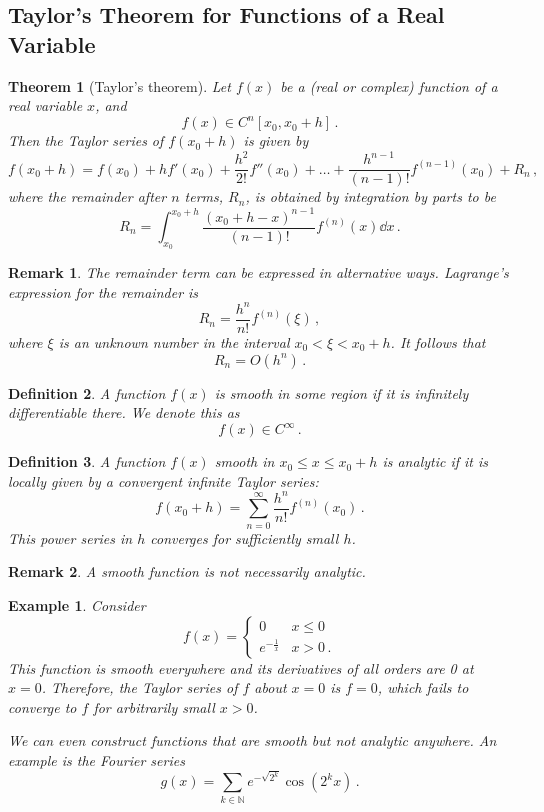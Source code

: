 \documentclass{article}
\theoremstyle{plain}\theoremheaderfont{\normalfont\itshape}\theorembodyfont{\rmfamily}\theoremseparator{.}\newtheorem*{rem}{Remark}\newtheorem*{ex}{Example}\newtheorem*{proof}{Proof}\newtheorem*{altp}{Alternative proof}
\theoremstyle{plain}\theoremheaderfont{\normalfont\bfseries}\theorembodyfont{\rmfamily}\theoremseparator{.}\newtheorem{thm}{Theorem}[section]\newtheorem{lem}[thm]{Lemma}\newtheorem{prop}[thm]{Proposition}\newtheorem*{cor}{Corollary}\newtheorem{defn}[thm]{Definition}\newtheorem{clm}[thm]{Claim}\newtheorem{clminproof}{Claim}
\theoremstyle{break}\theoremheaderfont{\normalfont\itshape}\theorembodyfont{\rmfamily}\theoremseparator{.\medskip}\newtheorem*{proofskip}{Proof}\newtheorem*{exs}{Examples}\newtheorem*{rems}{Remarks}
\theoremstyle{break}\theoremheaderfont{\normalfont\bfseries}\theorembodyfont{\rmfamily}\theoremseparator{.\medskip}\newtheorem{lemskip}[thm]{Lemma}\newtheorem{defnskip}[thm]{Definition}\newtheorem{propskip}[thm]{Proposition}\newtheorem{thmskip}[thm]{Theorem}
\numberwithin{equation}{section}
\begin{document}
	\subsection{Taylor's Theorem for Functions of a Real Variable}
	\begin{thm}[Taylor's theorem]		
		Let \(f(x)\) be a (real or complex) function of a real variable \(x\), and
		\[f(x)\in C^n [x_0,x_0+h]\,.\]
		Then the Taylor series of \(f(x_0+h)\) is given by
		\[f(x_0+h)=f(x_0)+hf'(x_0)+\frac{h^2}{2!}f''(x_0)+\dots+\frac{h^{n-1}}{(n-1)!}f^{(n-1)}(x_0)+R_n\,,\]
		where the remainder after \(n\) terms, \(R_n\), is obtained by integration by parts to be
		\[R_n=\int_{x_0}^{x_0+h}\frac{(x_0+h-x)^{n-1}}{(n-1)!}f^{(n)}(x)\dd{x}\,.\]
	\end{thm}
	
	\begin{rem}
		The remainder term can be expressed in alternative ways. Lagrange's expression for the remainder is
		\[R_n=\frac{h^n}{n!}f^{(n)}(\xi)\,,\]
		where \(\xi\) is an unknown number in the interval \(x_0<\xi<x_0+h\). It follows that
		\[R_n=O(h^n)\,.\]
	\end{rem}
	\begin{defn}
		A function \(f(x)\) is \textit{smooth} in some region if it is infinitely differentiable there. We denote this as
		\[f(x)\in C^\infty\,.\]
	\end{defn}
	\begin{defn}
		A function \(f(x)\) smooth in \(x_0\le x\le x_0+h\) is \textit{analytic} if it is locally given by a convergent infinite Taylor series:
		\[f(x_0+h)=\sum_{n=0}^{\infty}\frac{h^n}{n!}f^{(n)}(x_0)\,.\]
		This power series in \(h\) converges for sufficiently small \(h\).
	\end{defn}
	\begin{rem}
		A smooth function is not necessarily analytic.
	\end{rem}
	\begin{ex}
		Consider
		\[f(x)=\begin{cases}
			0 & x\le 0\\
			e^{-\frac{1}{x}} & x>0\,.
		\end{cases}\]
		This function is smooth everywhere and its derivatives of all orders are 0 at \(x=0\). Therefore, the Taylor series of \(f\) about \(x=0\) is \(f=0\), which fails to converge to \(f\) for arbitrarily small \(x>0\).

		\begin{figure}[ht!]
			\centering
		\end{figure}
		
		We can even construct functions that are smooth but not analytic anywhere. An example is the Fourier series
		\[g(x)=\sum_{k\in\mathbb{N}}e^{-\sqrt{2^k}}\cos(2^k x)\,.\]
	\end{ex}
\end{document}
